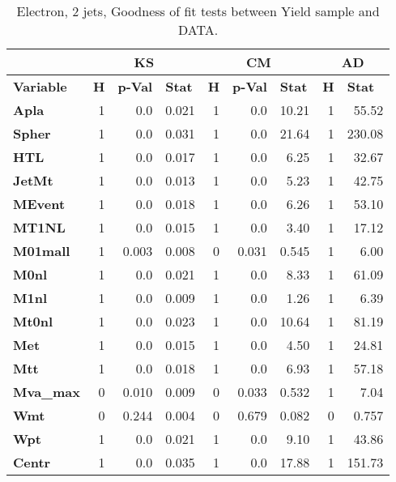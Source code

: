 \begin{table}[htbp] \footnotesize
\caption{Electron, 2 jets, Goodness of fit tests between Yield sample and DATA.}
\begin{center}
\begin{tabular}{|l|r|r|r|r|r|r|r|r|}
\hline
 & \multicolumn{ 3}{c|}{\textbf{KS}} & \multicolumn{ 3}{c|}{\textbf{CM}} & \multicolumn{ 2}{c|}{\textbf{AD}} \\ \hline
\textbf{Variable} & \multicolumn{1}{l|}{\textbf{H}} & \multicolumn{1}{l|}{\textbf{p-Val}} & \multicolumn{1}{l|}{\textbf{Stat}} & \multicolumn{1}{l|}{\textbf{H}} & \multicolumn{1}{l|}{\textbf{p-Val}} & \multicolumn{1}{l|}{\textbf{Stat}} & \multicolumn{1}{l|}{\textbf{H}} & \multicolumn{1}{l|}{\textbf{Stat}} \\ \hline
\textbf{Apla} & 1 & 0.0 & 0.021 & 1 & 0.0 & 10.21 & 1 & 55.52 \\ \hline
\textbf{Spher} & 1 & 0.0 & 0.031 & 1 & 0.0 & 21.64 & 1 & 230.08 \\ \hline
\textbf{HTL} & 1 & 0.0 & 0.017 & 1 & 0.0 & 6.25 & 1 & 32.67 \\ \hline
\textbf{JetMt} & 1 & 0.0 & 0.013 & 1 & 0.0 & 5.23 & 1 & 42.75 \\ \hline
\textbf{MEvent} & 1 & 0.0 & 0.018 & 1 & 0.0 & 6.26 & 1 & 53.10 \\ \hline
\textbf{MT1NL} & 1 & 0.0 & 0.015 & 1 & 0.0 & 3.40 & 1 & 17.12 \\ \hline
\textbf{M01mall} & 1 & 0.003 & 0.008 & 0 & 0.031 & 0.545 & 1 & 6.00 \\ \hline
\textbf{M0nl} & 1 & 0.0 & 0.021 & 1 & 0.0 & 8.33 & 1 & 61.09 \\ \hline
\textbf{M1nl} & 1 & 0.0 & 0.009 & 1 & 0.0 & 1.26 & 1 & 6.39 \\ \hline
\textbf{Mt0nl} & 1 & 0.0 & 0.023 & 1 & 0.0 & 10.64 & 1 & 81.19 \\ \hline
\textbf{Met} & 1 & 0.0 & 0.015 & 1 & 0.0 & 4.50 & 1 & 24.81 \\ \hline
\textbf{Mtt} & 1 & 0.0 & 0.018 & 1 & 0.0 & 6.93 & 1 & 57.18 \\ \hline
\textbf{Mva\_max} & 0 & 0.010 & 0.009 & 0 & 0.033 & 0.532 & 1 & 7.04 \\ \hline
\textbf{Wmt} & 0 & 0.244 & 0.004 & 0 & 0.679 & 0.082 & 0 & 0.757 \\ \hline
\textbf{Wpt} & 1 & 0.0 & 0.021 & 1 & 0.0 & 9.10 & 1 & 43.86 \\ \hline
\textbf{Centr} & 1 & 0.0 & 0.035 & 1 & 0.0 & 17.88 & 1 & 151.73 \\ \hline

\end{tabular}
\end{center}
\end{table}
